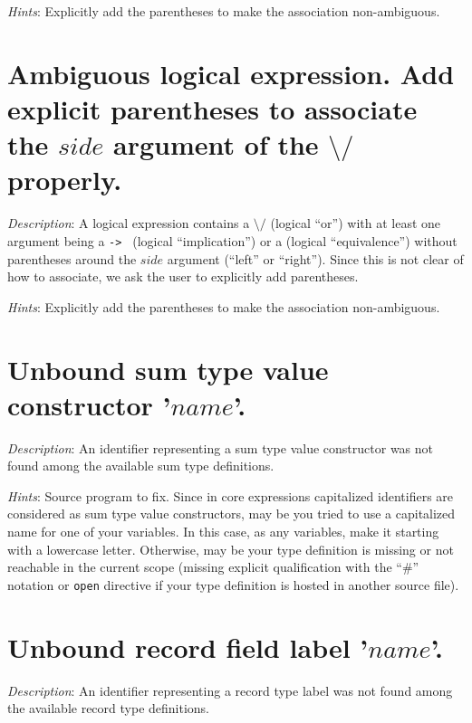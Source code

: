 {\em Hints}: Explicitly add the parentheses to make the association
non-ambiguous.



\section*{Ambiguous logical expression. Add explicit parentheses to
  associate the $side$ argument of the {\tt $\setminus/$} properly.}
{\em Description}: A logical expression contains a
{\tt $\setminus/$} (logical ``or'') with at least one argument being a
{\tt -> } (logical ``implication'') or a {\tt <->} (logical
``equivalence'') without parentheses around the $side$ argument (``left''
or ``right''). Since this is not clear of how to associate, we  ask the user to explicitly add parentheses.

{\em Hints}: Explicitly add the parentheses to make the association
non-ambiguous.



\section*{Unbound sum type value constructor '$name$'.}
{\em Description}: An identifier representing a sum type value constructor
was not found among the available sum type definitions.

{\em Hints}: Source program to fix. Since in core expressions
capitalized identifiers are considered as sum type value constructors,
may be you tried to use a capitalized name for one of your
variables. In this case, as any variables, make it starting with a
lowercase letter. Otherwise, may be your type definition is missing or
not reachable in the current scope (missing explicit qualification
with the ``\#'' notation or {\tt open} directive if your type
definition is hosted in another source file).



\section*{Unbound record field label '$name$'.}
{\em Description}: An identifier representing a record type label
was not found among the available record type definitions.

